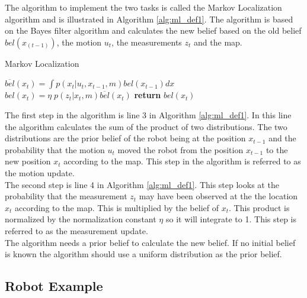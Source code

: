 The algorithm to implement the two tasks is called the Markov Localization algorithm and is illustrated in Algorithm \ref{alg:ml_def1}. The algorithm is based on the Bayes filter algorithm and calculates the new belief based on the old belief $bel(x_{(t-1)})$, the motion $u_t$, the measurements $z_t$ and the map.

\begin{center}
\begin{minipage}{.65\linewidth}
\begin{algorithm}[H]
\caption{Markov Localization}
\label{alg:ml_def1}
\begin{algorithmic}[1]
    \State $\overline{bel}(x_{t}) = \int{p(x_{t}|u_{t},x_{t-1},m)bel(x_{t-1})dx}$
    \State $bel(x_{t}) = \eta\;p(z_{t}|x_{t},m)\overline{bel}(x_{t})$
  \EndFor
  \State \textbf{return} $bel(x_{t})$
\EndProcedure
\end{algorithmic}
\end{algorithm}
\end{minipage}
\end{center}

The first step in the algorithm is line 3 in Algorithm \ref{alg:ml_def1}. In this line the algorithm calculates the sum of the product of two distributions. The two distributions are the prior belief of the robot being at the position $x_{t-1}$ and the probability that the motion $u_t$ moved the robot from the position $x_{t-1}$ to the new position $x_t$ according to the map. This step in the algorithm is referred to as the motion update. \\

The second step is line 4 in Algorithm \ref{alg:ml_def1}. This step looks at the probability that the measurement $z_t$ may have been observed at the the location $x_t$ according to the map. This is multiplied by the belief of $x_t$. This product is normalized by the normalization constant $\eta$ so it will integrate to 1. This step is referred to as the measurement update.\\

The algorithm needs a prior belief to calculate the new belief. If no initial belief is known the algorithm should use a uniform distribution as the prior belief.

\subsection{Robot Example} %
\label{sub:robot_example}

